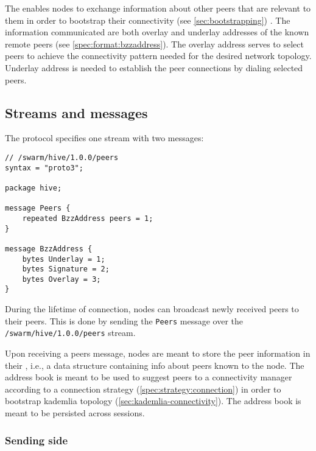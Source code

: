 The  enables nodes to exchange information about other peers that are relevant to them in order to bootstrap their connectivity  (see \ref{sec:bootstrapping}) . The information communicated are both overlay and underlay addresses of the known remote peers (see  \ref{spec:format:bzzaddress}). The overlay address serves to select peers to achieve the connectivity pattern needed for the desired network topology. Underlay address is needed to establish the peer connections by dialing selected peers.

\subsection{Streams and messages \statusgreen}


The protocol specifies one stream with two messages:

\begin{definition}\label{def:hive-messages}

\begin{lstlisting}
// /swarm/hive/1.0.0/peers
syntax = "proto3";

package hive;

message Peers {
    repeated BzzAddress peers = 1;
}

message BzzAddress {
    bytes Underlay = 1;
    bytes Signature = 2;
    bytes Overlay = 3;
}

\end{lstlisting}
\end{definition}

During the lifetime of connection, nodes can broadcast newly received peers to their peers. This is done by sending the \lstinline{Peers} message over the \\\lstinline{/swarm/hive/1.0.0/peers} stream.

Upon receiving a peers message, nodes are meant to store the peer information in their , i.e., a data structure containing info about peers known to the node. The address book is meant to be used to suggest peers  to a connectivity manager according to a connection strategy (\ref{spec:strategy:connection}) in order to bootstrap kademlia topology (\ref{sec:kademlia-connectivity}). The address book is meant to be persisted across sessions.

\subsubsection{Sending side}

